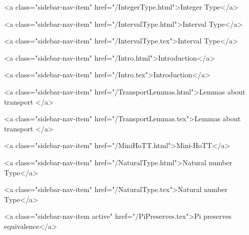           <a class="sidebar-nav-item" href="/IntegerType.html">Integer Type</a>
        
      
    
      
        
          <a class="sidebar-nav-item" href="/IntervalType.html">Interval Type</a>
        
      
    
      
        
          <a class="sidebar-nav-item" href="/IntervalType.tex">Interval Type</a>
        
      
    
      
        
          <a class="sidebar-nav-item" href="/Intro.html">Introduction</a>
        
      
    
      
        
          <a class="sidebar-nav-item" href="/Intro.tex">Introduction</a>
        
      
    
      
        
          <a class="sidebar-nav-item" href="/TransportLemmas.html">Lemmas about transport </a>
        
      
    
      
        
          <a class="sidebar-nav-item" href="/TransportLemmas.tex">Lemmas about transport </a>
        
      
    
      
        
          <a class="sidebar-nav-item" href="/MiniHoTT.html">Mini-HoTT</a>
        
      
    
      
        
          <a class="sidebar-nav-item" href="/NaturalType.html">Natural number Type</a>
        
      
    
      
        
          <a class="sidebar-nav-item" href="/NaturalType.tex">Natural number Type</a>
        
      
    
      
        
          <a class="sidebar-nav-item active" href="/PiPreserves.tex">Pi preserves equivalence</a>
        
      
    
      
        
